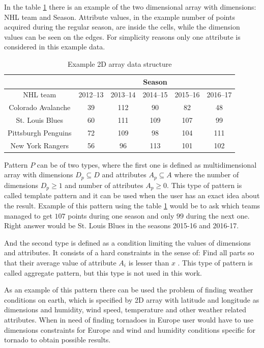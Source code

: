 In the table \ref{tab1} there is an example of the two dimensional array with dimensions: NHL team and Season. Attribute values, in the example number of points acquired during the regular season, are inside the cells, while the dimension values can be seen on the edges. For simplicity reasons only one attribute is considered in this example data. 
\begin{table}
\centering
\begin{tabular} {| c | c | c | c | c | c |}
\cline{2-6}
\multicolumn{1}{c|}{} & \multicolumn{5}{|c|}{Season} \\
\hline
NHL team & 2012--13 & 2013--14 & 2014--15 & 2015--16 & 2016--17\\
\hline
Colorado Avalanche & 39 & 112 & 90 & 82 & 48 \\
\hline
St. Louis Blues & 60 & 111 & 109 & 107 & 99 \\
\hline
Pittsburgh Penguins & 72 & 109 & 98 & 104 & 111 \\
\hline
New York Rangers & 56 & 96 & 113 & 101 & 102 \\
\hline

\end{tabular}
\caption{Example 2D array data structure}
\label{tab1}
\end{table}

Pattern $P$ can be of two types, where the first one is defined as multidimensional array with dimensions $D_p \subseteq D$ and attributes $A_p \subseteq A$ where the number of dimensions $D_p \geq 1$ and number of attributes $A_p \geq 0$.
This type of pattern is called template pattern and it can be used when the user has an exact idea about the result. Example of this pattern using the table \ref{tab1} would be to ask which teams managed to get $107$ points during one season and only $99$ during the next one. Right answer would be St. Louis Blues in the seasons 2015-16 and 2016-17.

And the second type is defined as a condition limiting the values of dimensions and attributes. It consists of a hard constraints in the sense of: Find all parts so that their average value of attribute $A_i$ is lesser than $x$ . This type of pattern is called aggregate pattern, but this type is not used in this work.

As an example of this pattern there can be used the problem of finding weather conditions on earth, which is specified by 2D array with latitude and longitude as dimensions and humidity, wind speed, temperature and other weather related attributes. When in need of finding tornadoes in Europe user would have to use dimensions constraints for Europe and wind and humidity conditions specific for tornado to obtain possible results.

